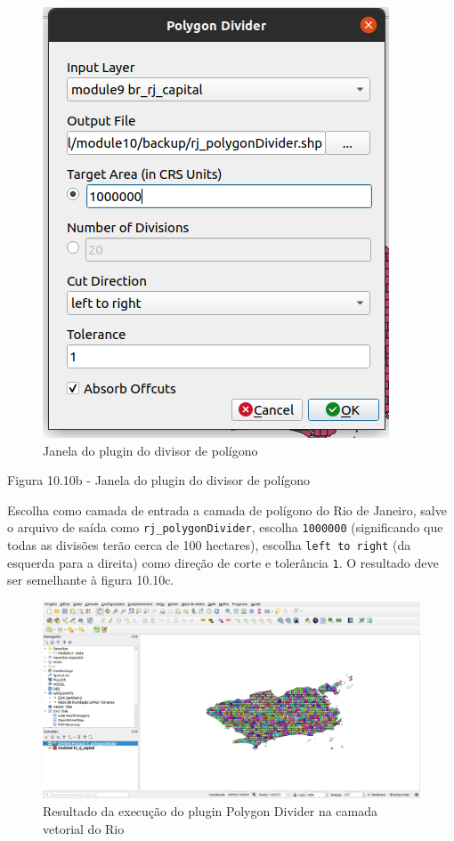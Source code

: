 \documentclass[
]{krantz}
\begin{document}
\begin{figure}
\centering
\includegraphics{media/modulo10/fig1010_b.png}
\caption{Janela do plugin do divisor de polígono}
\end{figure}

Figura 10.10b - Janela do plugin do divisor de polígono

Escolha como camada de entrada a camada de polígono do Rio de Janeiro, salve o arquivo de saída como \texttt{rj\_polygonDivider}, escolha \texttt{1000000} (significando que todas as divisões terão cerca de 100 hectares), escolha \texttt{left\ to\ right} (da esquerda para a direita) como direção de corte e tolerância \texttt{1}. O resultado deve ser semelhante à figura 10.10c.

\begin{figure}
\centering
\includegraphics{media/modulo10/fig1010_c.png}
\caption{Resultado da execução do plugin Polygon Divider na camada vetorial do Rio}
\end{figure}
\end{document}
